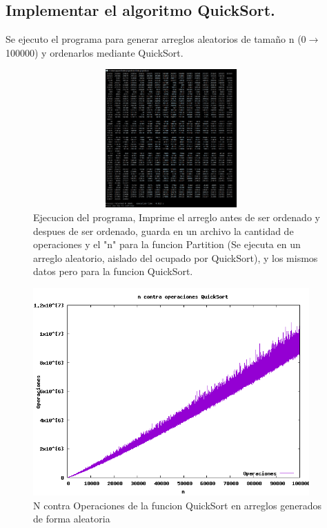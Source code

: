 \documentclass[spanish]{article}
\begin{document}
	\subsection{Implementar el algoritmo QuickSort.}
	Se ejecuto el programa para generar arreglos aleatorios de tamaño n (0$\rightarrow$100000) y ordenarlos mediante QuickSort.			
	\begin{figure}[h!]
		\centering
		\includegraphics[width=400px,height=200px]{ejecucionPrimeraParte}
		\caption{Ejecucion del programa, Imprime el arreglo antes de ser ordenado y despues de ser ordenado, guarda en un archivo la cantidad de operaciones y el "n" para la funcion Partition (Se ejecuta en un arreglo aleatorio, aislado del ocupado por QuickSort), y los mismos datos pero para la funcion QuickSort.}
	\end{figure}
	\begin{figure}[H]
		\centering
		\includegraphics[width=400px,height=300px]{grafica1}
		\caption{N contra Operaciones de la funcion QuickSort en arreglos generados de forma aleatoria}
	\end{figure}
\end{document}

